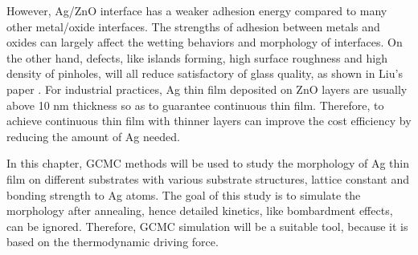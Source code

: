 However, Ag/ZnO interface has a weaker adhesion energy compared to many other metal/oxide interfaces. The strengths of adhesion between metals and oxides can largely affect the wetting behaviors and morphology of interfaces. On the other hand, defects, like islands forming, high surface roughness and high density of pinholes, will all reduce satisfactory of glass quality, as shown in Liu's paper \cite{liu2013lithography}. For industrial practices, Ag thin film deposited on ZnO layers are usually above 10 nm thickness so as to guarantee continuous thin film. Therefore, to achieve continuous thin film with thinner layers can improve the cost efficiency by reducing the amount of Ag needed.

In this chapter, \ac{GCMC} methods will be used to study the morphology of Ag thin film on different substrates with various substrate structures, lattice constant and bonding strength to Ag atoms. The goal of this study is to simulate the morphology after annealing, hence detailed kinetics, like bombardment effects, can be ignored. Therefore, \ac{GCMC} simulation will be a suitable tool, because it is based on the thermodynamic driving force.